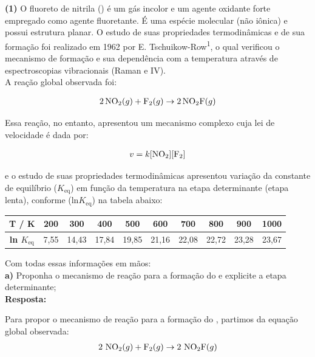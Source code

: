 \textbf{(1)} O fluoreto de nitrila () é um gás incolor e um agente oxidante forte empregado como agente fluoretante. É uma espécie molecular (não iônica) e possui estrutura planar. O estudo de suas propriedades termodinâmicas e de sua formação foi realizado em 1962 por E. Tschuikow-Row\textsuperscript{1}, o qual verificou o mecanismo de formação e sua dependência com a temperatura através de espectroscopias vibracionais (Raman e IV).\\

A reação global observada foi:

\begin{align*}
    2\,\ce{NO2}(g) + \ce{F2}(g) \rightarrow 2\,\ce{NO2F}(g)
\end{align*}

 Essa reação, no entanto, apresentou um mecanismo complexo cuja lei de velocidade é dada por:

\begin{align*}
    v = k[\ce{NO2}][\ce{F2}]
\end{align*}

e o estudo de suas propriedades termodinâmicas apresentou variação da constante de equilíbrio ($K_{\text{eq}}$) em função da temperatura na etapa determinante (etapa lenta), conforme (ln$K_{\text{eq}}$) na tabela abaixo:

\begin{center}
\begin{tabular}{|c|c|c|c|c|c|c|c|c|c|}
\hline
\textbf{T / K} & 200 & 300 & 400 & 500 & 600 & 700 & 800 & 900 & 1000 \\
\hline
\textbf{ln $K_{\text{eq}}$} & 7,55 & 14,43 & 17,84 & 19,85 & 21,16 & 22,08 & 22,72 & 23,28 & 23,67 \\
\hline
\end{tabular}
\end{center}

\bigskip

Com todas essas informações em mãos:\\

\textbf{a)} Proponha o mecanismo de reação para a formação do  e explicite a etapa determinante;\\

\textbf{Resposta:} 

Para propor o mecanismo de reação para a formação do , partimos da equação global observada:
\begin{align*}
2\ \ce{NO2}(g) + \ce{F2}(g) \rightarrow 2\ \ce{NO2F}(g)
\end{align*}

